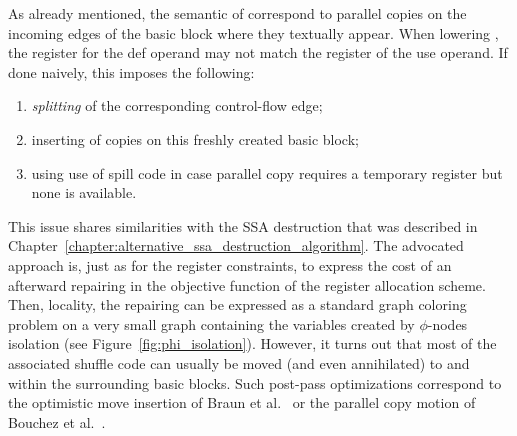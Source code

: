 {%
As already mentioned, the semantic of \phifuns correspond to parallel copies on the incoming edges of the basic block where they textually appear.
When lowering \phifuns, the register for the def operand may not match the register of the use operand. If done naively, this imposes the following:
\begin{enumerate}
  \item \emph{splitting} of the corresponding control-flow edge;
  \item inserting of copies on this freshly created basic block;
  \item using use of spill code in case parallel copy requires a temporary register but none is available.
\end{enumerate}
This issue shares similarities with the SSA destruction that was described in Chapter~\ref{chapter:alternative_ssa_destruction_algorithm}.
The advocated approach is, just as for the register constraints, to express the cost of an afterward repairing in the objective function of the register allocation scheme.
Then, locality, the repairing can be expressed as a standard graph coloring problem on a very small graph containing the variables created by $\phi$-nodes isolation (see Figure~\ref{fig:phi_isolation}).
However, it turns out that most of the associated shuffle code can usually be moved (and even annihilated) to and within the surrounding basic blocks.
Such post-pass optimizations correspond to the optimistic move insertion of Braun et al.~\cite{braun2010preference} or the parallel copy motion of Bouchez et al.~\cite{Bouchez:2010:PCM}.

}
